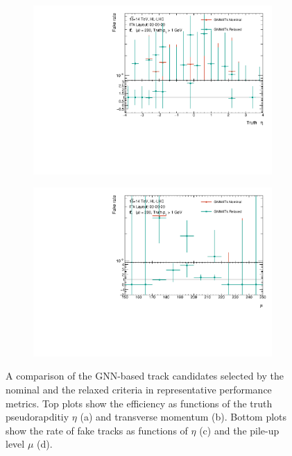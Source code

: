\begin{figure}[h!]
\begin{subfigure}{0.49\textwidth}
    \includegraphics[width=\textwidth]{figures/nominal-vs-relaxed-cuts/FakeRate/fakerate_vs_eta.pdf}
    \caption{}
    \label{subfig:nominal-vs-relaxed-fake}
\end{subfigure}
\begin{subfigure}{0.49\textwidth}
    \centering
    \includegraphics[width=\textwidth]{figures/nominal-vs-relaxed-cuts/FakeRate/fakerate_vs_mu.pdf}
    \caption{}
    \label{subfig:nominal-vs-relaxed-fake-mu}
\end{subfigure}
    \caption{A comparison of the GNN-based track candidates selected by the nominal and the relaxed criteria in representative performance metrics. Top plots show the efficiency as functions of the truth pseudorapditiy $\eta$ (a) and transverse momentum \pT (b). Bottom plots show the rate of fake tracks as functions of $\eta$ (c) and the pile-up level $\mu$ (d).}
    \label{fig:nominal-vs-relaxed}
\end{figure}

